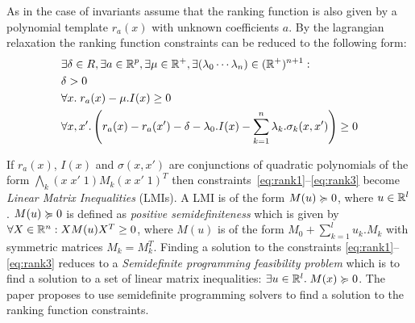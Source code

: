As in the case of invariants assume that the ranking function is also given by
a polynomial template $r_a(x)$ with unknown coefficients $a$. By the lagrangian
relaxation the ranking function constraints can be reduced to the following form:
%
\begin{align}
& \nonumber \exists \delta \in R, \exists a \in \real^p, \exists \mu \in \real^+, \exists (\lambda_0 \cdots \lambda_n) \in (\real^+)^{n+1} : \\
& \delta > 0 \label{eq:rank1}\\
& \forall x. \; r_a(x) - \mu.I(x)  \ge 0 \label{eq:rank2}\\
& \forall x,x'. \left( r_a(x) - r_a(x') - \delta - \lambda_0.I(x) - \sum \limits_{k=1}^{n} \lambda_k. \sigma_k(x,x') \right) \ge 0 \label{eq:rank3}
\end{align}

If $r_a(x)$, $I(x)$ and $\sigma(x,x')$ are conjunctions of quadratic polynomials 
of the form $\bigwedge_k (x \; x' \; 1) M_k (x \; x' \; 1)^T$ then constraints~\ref{eq:rank1}--\ref{eq:rank3} become \emph{Linear Matrix Inequalities} (LMIs). A LMI is of the form  $M(u) \succcurlyeq 0$, where $u \in \mathbb{R}^l$. 
$M(u) \succcurlyeq 0$ is defined as \emph{positive semidefiniteness} which is 
given by $\forall X \in \mathbb{R}^n: X M(u) X^T \ge 0$, where 
$M(u)$ is of the form $M_0 + \sum \limits_{k=1}^{l} u_k. M_k$ with
symmetric matrices $M_k = M_k^T$.
Finding a solution to the constraints \ref{eq:rank1}--\ref{eq:rank3}
reduces to a \emph{Semidefinite programming feasibility problem} which 
is to find a solution to a set of linear
matrix inequalities: $\exists u \in \mathbb{R}^l. \; M(x) \succcurlyeq 0$.
The paper proposes to use semidefinite programming solvers 
to find a solution to the ranking function constraints.

